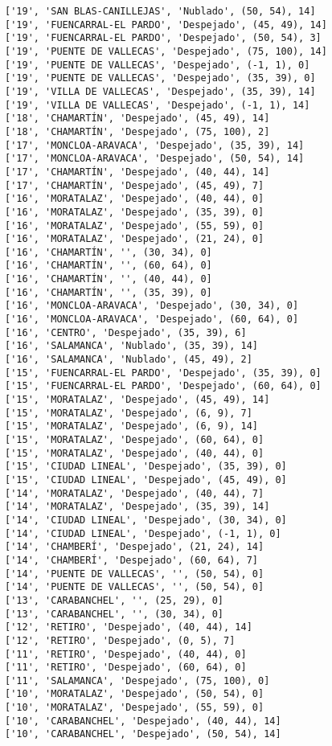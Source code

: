 \documentclass[11pt]{article}
\begin{document}
\begin{Verbatim}[commandchars=\\\{\}]
['19', 'SAN BLAS-CANILLEJAS', 'Nublado', (50, 54), 14]
['19', 'FUENCARRAL-EL PARDO', 'Despejado', (45, 49), 14]
['19', 'FUENCARRAL-EL PARDO', 'Despejado', (50, 54), 3]
['19', 'PUENTE DE VALLECAS', 'Despejado', (75, 100), 14]
['19', 'PUENTE DE VALLECAS', 'Despejado', (-1, 1), 0]
['19', 'PUENTE DE VALLECAS', 'Despejado', (35, 39), 0]
['19', 'VILLA DE VALLECAS', 'Despejado', (35, 39), 14]
['19', 'VILLA DE VALLECAS', 'Despejado', (-1, 1), 14]
['18', 'CHAMARTÍN', 'Despejado', (45, 49), 14]
['18', 'CHAMARTÍN', 'Despejado', (75, 100), 2]
['17', 'MONCLOA-ARAVACA', 'Despejado', (35, 39), 14]
['17', 'MONCLOA-ARAVACA', 'Despejado', (50, 54), 14]
['17', 'CHAMARTÍN', 'Despejado', (40, 44), 14]
['17', 'CHAMARTÍN', 'Despejado', (45, 49), 7]
['16', 'MORATALAZ', 'Despejado', (40, 44), 0]
['16', 'MORATALAZ', 'Despejado', (35, 39), 0]
['16', 'MORATALAZ', 'Despejado', (55, 59), 0]
['16', 'MORATALAZ', 'Despejado', (21, 24), 0]
['16', 'CHAMARTÍN', '', (30, 34), 0]
['16', 'CHAMARTÍN', '', (60, 64), 0]
['16', 'CHAMARTÍN', '', (40, 44), 0]
['16', 'CHAMARTÍN', '', (35, 39), 0]
['16', 'MONCLOA-ARAVACA', 'Despejado', (30, 34), 0]
['16', 'MONCLOA-ARAVACA', 'Despejado', (60, 64), 0]
['16', 'CENTRO', 'Despejado', (35, 39), 6]
['16', 'SALAMANCA', 'Nublado', (35, 39), 14]
['16', 'SALAMANCA', 'Nublado', (45, 49), 2]
['15', 'FUENCARRAL-EL PARDO', 'Despejado', (35, 39), 0]
['15', 'FUENCARRAL-EL PARDO', 'Despejado', (60, 64), 0]
['15', 'MORATALAZ', 'Despejado', (45, 49), 14]
['15', 'MORATALAZ', 'Despejado', (6, 9), 7]
['15', 'MORATALAZ', 'Despejado', (6, 9), 14]
['15', 'MORATALAZ', 'Despejado', (60, 64), 0]
['15', 'MORATALAZ', 'Despejado', (40, 44), 0]
['15', 'CIUDAD LINEAL', 'Despejado', (35, 39), 0]
['15', 'CIUDAD LINEAL', 'Despejado', (45, 49), 0]
['14', 'MORATALAZ', 'Despejado', (40, 44), 7]
['14', 'MORATALAZ', 'Despejado', (35, 39), 14]
['14', 'CIUDAD LINEAL', 'Despejado', (30, 34), 0]
['14', 'CIUDAD LINEAL', 'Despejado', (-1, 1), 0]
['14', 'CHAMBERÍ', 'Despejado', (21, 24), 14]
['14', 'CHAMBERÍ', 'Despejado', (60, 64), 7]
['14', 'PUENTE DE VALLECAS', '', (50, 54), 0]
['14', 'PUENTE DE VALLECAS', '', (50, 54), 0]
['13', 'CARABANCHEL', '', (25, 29), 0]
['13', 'CARABANCHEL', '', (30, 34), 0]
['12', 'RETIRO', 'Despejado', (40, 44), 14]
['12', 'RETIRO', 'Despejado', (0, 5), 7]
['11', 'RETIRO', 'Despejado', (40, 44), 0]
['11', 'RETIRO', 'Despejado', (60, 64), 0]
['11', 'SALAMANCA', 'Despejado', (75, 100), 0]
['10', 'MORATALAZ', 'Despejado', (50, 54), 0]
['10', 'MORATALAZ', 'Despejado', (55, 59), 0]
['10', 'CARABANCHEL', 'Despejado', (40, 44), 14]
['10', 'CARABANCHEL', 'Despejado', (50, 54), 14]

\end{Verbatim}
\end{document}
